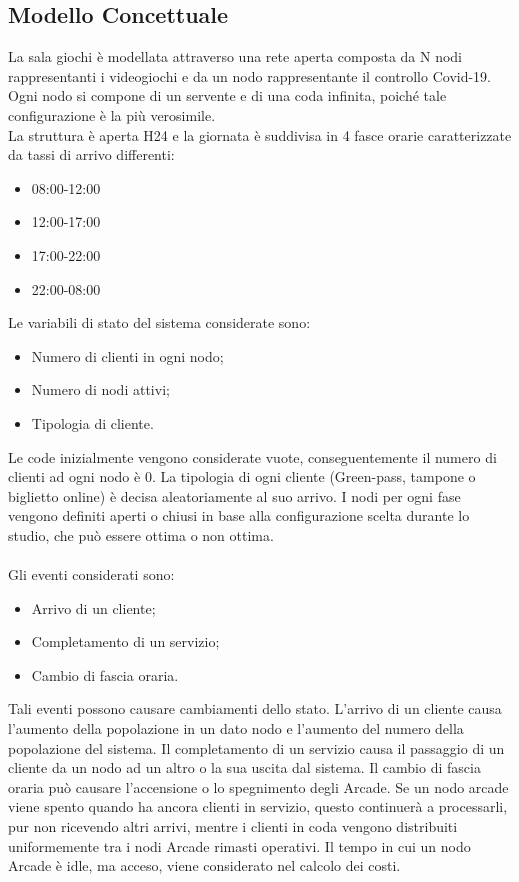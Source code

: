 \documentclass{article}
\begin{document}
\subsection{Modello Concettuale}
La sala giochi è modellata attraverso una rete aperta composta da N nodi rappresentanti i videogiochi e da un nodo rappresentante il controllo Covid-19. Ogni nodo si compone di un servente e di una coda infinita, poiché tale configurazione è la più verosimile.
\\
La struttura è aperta H24 e la giornata è suddivisa in 4 fasce orarie caratterizzate da tassi di arrivo differenti:
\begin{itemize}
\item 08:00-12:00
\item 12:00-17:00
\item 17:00-22:00
\item 22:00-08:00



\end{itemize}
Le variabili di stato del sistema considerate sono:
\begin{itemize}
\item Numero di clienti in ogni nodo;
\item Numero di nodi attivi;
\item Tipologia di cliente.
\end{itemize}
Le code inizialmente vengono considerate vuote, conseguentemente il numero di
clienti ad ogni nodo è 0. La tipologia di ogni cliente (Green-pass, tampone o biglietto online) è decisa aleatoriamente al suo arrivo. I nodi per ogni fase vengono definiti aperti o chiusi in base alla configurazione scelta durante lo studio, che può essere ottima o non
ottima.
\\ \\
Gli eventi considerati sono:
\begin{itemize}
\item Arrivo di un cliente;
\item Completamento di un servizio;
\item Cambio di fascia oraria.
\end{itemize}
Tali eventi possono causare cambiamenti dello stato. L’arrivo di un cliente causa
l’aumento della popolazione in un dato nodo e l’aumento del numero della popolazione del sistema. Il completamento di un servizio causa il passaggio di un cliente da un
nodo ad un altro o la sua uscita dal sistema. Il cambio di fascia oraria può causare
l’accensione o lo spegnimento degli Arcade. Se un nodo arcade viene spento quando ha ancora
clienti in servizio, questo continuerà a processarli, pur non ricevendo altri
arrivi, mentre i clienti in coda vengono distribuiti uniformemente tra i nodi Arcade rimasti operativi. Il tempo in cui un nodo Arcade è idle, ma acceso, viene considerato nel calcolo dei
costi.
\end{document}
